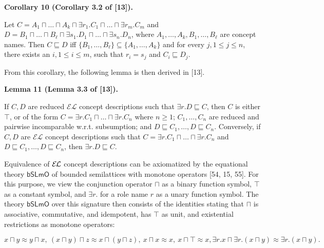 \documentclass[10pt,a4paper]{amsart}
\begin{document}
\par\medskip\noindent\textbf{Corollary 10 (Corollary 3.2 of [13]).}\par
 
 
Let $C=A_{1}\sqcap\ldots\sqcap A_{k}\sqcap\exists r_{1}.C_{1}\sqcap\ldots\sqcap%
\exists r_{m}.C_{m}$ and $D=B_{1}\sqcap\ldots\sqcap B_{\ell}\sqcap\exists s_{1}.D_{1}\sqcap\ldots\sqcap%
\exists s_{n}.D_{n}$, where $A_{1},\ldots,A_{k},B_{1},\ldots,B_{\ell}$ are concept names. Then $C\sqsubseteq D$ iff $\{B_{1},\ldots,B_{\ell}\}\subseteq\{A_{1},\ldots,A_{k}\}$ and for every $j,1\leq j\leq n$, there exists an $i,1\leq i\leq m$, such that $r_{i}=s_{j}$ and $C_{i}\sqsubseteq D_{j}$.\par
 
 
 
 
From this corollary, the following lemma is then derived in [13].\par
 
 
 
\par\medskip\noindent\textbf{Lemma 11 (Lemma 3.3 of [13]).}\par
 
 
If $C,D$ are reduced $\mathcal{EL}$ concept descriptions such that $\exists r.D\sqsubseteq C$, then $C$ is either $\top$, or of the form $C=\exists r.C_{1}\sqcap\ldots\sqcap\exists r.C_{n}$ where $n\geq 1$; $C_{1},\ldots,C_{n}$ are reduced and pairwise incomparable w.r.t. subsumption; and $D\sqsubseteq C_{1},\ldots,D\sqsubseteq C_{n}$. Conversely, if $C,D$ are $\mathcal{EL}$ concept descriptions such that $C=\exists r.C_{1}\sqcap\ldots\sqcap\exists r.C_{n}$ and $D\sqsubseteq C_{1},\ldots,D\sqsubseteq C_{n}$, then $\exists r.D\sqsubseteq C$.\par
 
 
 
 
Equivalence of $\mathcal{E\mkern-1.618muL}$ concept descriptions can be axiomatized by the equational theory $\mathsf{bSLmO}$ of bounded semilattices with monotone operators [54, 15, 55]. For this purpose, we view the conjunction operator $\sqcap$ as a binary function symbol, $\top$ as a constant symbol, and $\exists r.$ for a role name $r$ as a unary function symbol. The theory $\mathsf{bSLmO}$ over this signature then consists of the identities stating that $\sqcap$ is associative, commutative, and idempotent, has $\top$ as unit, and existential restrictions as monotone operators:\par
    \[x\sqcap y\approx y\sqcap x,\ (x\sqcap y)\sqcap z\approx x\sqcap(y\sqcap z),\ x%
\sqcap x\approx x,\ x\sqcap\top\approx x,\exists r.x\sqcap\exists r.(x\sqcap y%
)\approx\exists r.(x\sqcap y).\]    
 
\end{document}
